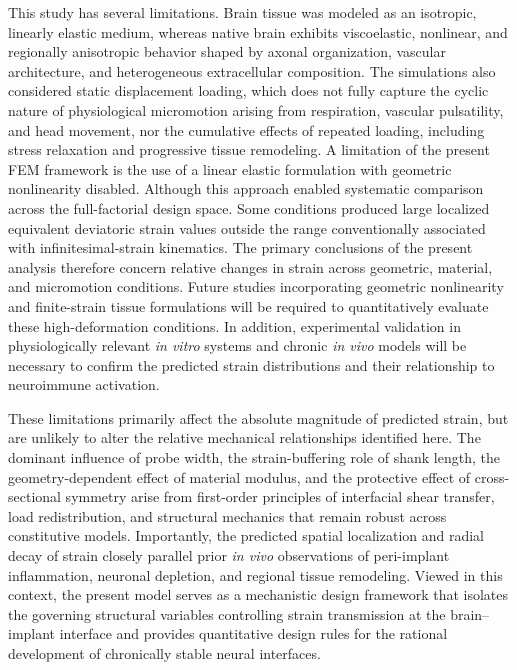 \documentclass[fleqn,10pt]{wlscirep}
\begin{document}
This study has several limitations. Brain tissue was modeled as an isotropic, linearly elastic medium, whereas native brain exhibits viscoelastic, nonlinear, and regionally anisotropic behavior shaped by axonal organization, vascular architecture, and heterogeneous extracellular composition. The simulations also considered static displacement loading, which does not fully capture the cyclic nature of physiological micromotion arising from respiration, vascular pulsatility, and head movement, nor the cumulative effects of repeated loading, including stress relaxation and progressive tissue remodeling. A limitation of the present FEM framework is the use of a linear elastic formulation with geometric nonlinearity disabled. Although this approach enabled systematic comparison across the full-factorial design space. Some conditions produced large localized equivalent deviatoric strain values outside the range conventionally associated with infinitesimal-strain kinematics. The primary conclusions of the present analysis therefore concern relative changes in strain across geometric, material, and micromotion conditions. Future studies incorporating geometric nonlinearity and finite-strain tissue formulations will be required to quantitatively evaluate these high-deformation conditions. In addition, experimental validation in physiologically relevant \textit{in vitro} systems and chronic \textit{in vivo} models will be necessary to confirm the predicted strain distributions and their relationship to neuroimmune activation.

These limitations primarily affect the absolute magnitude of predicted strain, but are unlikely to alter the relative mechanical relationships identified here. The dominant influence of probe width, the strain-buffering role of shank length, the geometry-dependent effect of material modulus, and the protective effect of cross-sectional symmetry arise from first-order principles of interfacial shear transfer, load redistribution, and structural mechanics that remain robust across constitutive models. Importantly, the predicted spatial localization and radial decay of strain closely parallel prior \textit{in vivo} observations of peri-implant inflammation, neuronal depletion, and regional tissue remodeling. Viewed in this context, the present model serves as a mechanistic design framework that isolates the governing structural variables controlling strain transmission at the brain--implant interface and provides quantitative design rules for the rational development of chronically stable neural interfaces.
\end{document}
